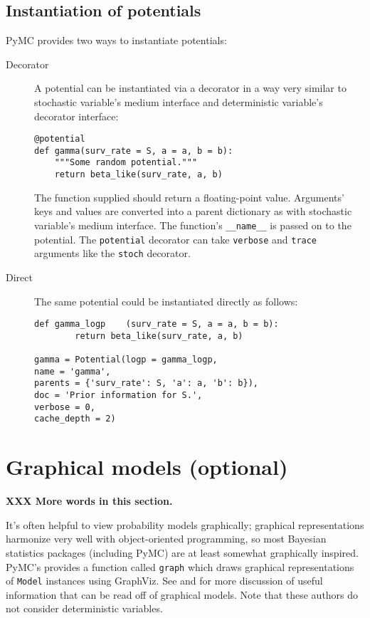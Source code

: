 \subsection{Instantiation of potentials}
PyMC provides two ways to instantiate potentials:
\begin{description}
    \item[Decorator] A potential can be instantiated via a decorator in a way very similar to stochastic variable's medium interface and deterministic variable's decorator interface:
\begin{verbatim}
@potential
def gamma(surv_rate = S, a = a, b = b):
    """Some random potential."""
    return beta_like(surv_rate, a, b)
\end{verbatim}
The function supplied should return a floating-point value. Arguments' keys and values are converted into a parent dictionary as with stochastic variable's medium interface. The function's \texttt{\_\_name\_\_} is passed on to the potential. The \texttt{potential} decorator can take \texttt{verbose} and \texttt{trace} arguments like the \texttt{stoch} decorator.
    \item[Direct] The same potential could be instantiated directly as follows:
\begin{verbatim}
def gamma_logp    (surv_rate = S, a = a, b = b):
        return beta_like(surv_rate, a, b)
        
gamma = Potential(logp = gamma_logp, 
name = 'gamma',
parents = {'surv_rate': S, 'a': a, 'b': b}),
doc = 'Prior information for S.',
verbose = 0,
cache_depth = 2)
\end{verbatim}
\end{description}

\section{Graphical models (optional)}
\label{sec:graphical}
\textbf{XXX More words in this section.}

It's often helpful to view probability models graphically; graphical representations harmonize very well with object-oriented programming, so most Bayesian statistics packages (including PyMC) are at least somewhat graphically inspired. PyMC's provides a function called \texttt{graph} which draws graphical representations of \texttt{Model} instances using GraphViz. See \cite{dawidmarkov} and \cite{jordangraphical} for more discussion of useful information that can be read off of graphical models. Note that these authors do not consider deterministic variables.

